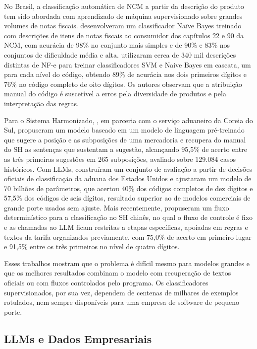 No Brasil, a classificação automática de NCM a partir da descrição do produto tem sido abordada com aprendizado de máquina supervisionado sobre grandes volumes de notas fiscais.  desenvolveram um classificador Naïve Bayes treinado com descrições de itens de notas fiscais ao consumidor dos capítulos 22 e 90 da NCM, com acurácia de 98\% no conjunto mais simples e de 90\% e 83\% nos conjuntos de dificuldade média e alta.  utilizaram cerca de 340 mil descrições distintas de NF-e para treinar classificadores SVM e Naive Bayes em cascata, um para cada nível do código, obtendo 89\% de acurácia nos dois primeiros dígitos e 76\% no código completo de oito dígitos. Os autores observam que a atribuição manual do código é suscetível a erros pela diversidade de produtos e pela interpretação das regras.

Para o Sistema Harmonizado, , em parceria com o serviço aduaneiro da Coreia do Sul, propuseram um modelo baseado em um modelo de linguagem pré-treinado que sugere a posição e as subposições de uma mercadoria e recupera do manual do SH as sentenças que sustentam a sugestão, alcançando 95,5\% de acerto entre as três primeiras sugestões em 265 subposições, avaliado sobre 129.084 casos históricos. Com LLMs,  construíram um conjunto de avaliação a partir de decisões oficiais de classificação da aduana dos Estados Unidos e ajustaram um modelo de 70 bilhões de parâmetros, que acertou 40\% dos códigos completos de dez dígitos e 57,5\% dos códigos de seis dígitos, resultado superior ao de modelos comerciais de grande porte usados sem ajuste. Mais recentemente,  propuseram um fluxo determinístico para a classificação no SH chinês, no qual o fluxo de controle é fixo e as chamadas ao LLM ficam restritas a etapas específicas, apoiadas em regras e textos da tarifa organizados previamente, com 75,0\% de acerto em primeiro lugar e 91,5\% entre os três primeiros no nível de quatro dígitos.

Esses trabalhos mostram que o problema é difícil mesmo para modelos grandes e que os melhores resultados combinam o modelo com recuperação de textos oficiais ou com fluxos controlados pelo programa. Os classificadores supervisionados, por sua vez, dependem de centenas de milhares de exemplos rotulados, nem sempre disponíveis para uma empresa de software de pequeno porte.

\subsection{LLMs e Dados Empresariais}

